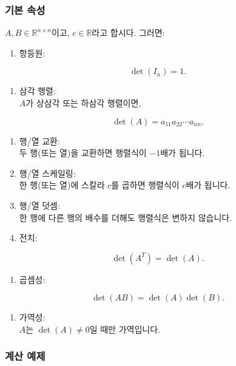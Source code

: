 \documentclass[
  12pt,
  a4paper,
]{article}
\begin{document}
\subsubsection{기본 속성}\label{basic-properties}

\(A, B \in \mathbb{R}^{n \times n}\)이고, \(c \in \mathbb{R}\)라고 합시다. 그러면:

\begin{enumerate}
\def\labelenumi{\arabic{enumi}.}
\item
  항등원:
\end{enumerate}

\[\det(I_n) = 1.\]

\begin{enumerate}
\def\labelenumi{\arabic{enumi}.}
\item
  삼각 행렬:\\
  \(A\)가 상삼각 또는 하삼각 행렬이면,
\end{enumerate}

\[\det(A) = a_{11} a_{22} \cdots a_{nn}.\]

\begin{enumerate}
\def\labelenumi{\arabic{enumi}.}
\item
  행/열 교환:\\
  두 행(또는 열)을 교환하면 행렬식이 \(-1\)배가 됩니다.
\item
  행/열 스케일링:\\
  한 행(또는 열)에 스칼라 \(c\)를 곱하면 행렬식이 \(c\)배가 됩니다.
\item
  행/열 덧셈:\\
  한 행에 다른 행의 배수를 더해도 행렬식은 변하지 않습니다.
\item
  전치:
\end{enumerate}

\[\det(A^T) = \det(A).\]

\begin{enumerate}
\def\labelenumi{\arabic{enumi}.}
\item
  곱셈성:
\end{enumerate}

\[\det(AB) = \det(A)\det(B).\]

\begin{enumerate}
\def\labelenumi{\arabic{enumi}.}
\item
  가역성:\\
  \(A\)는 \(\det(A) \neq 0\)일 때만 가역입니다.
\end{enumerate}

\subsubsection{계산 예제}\label{example-computations}
\end{document}

